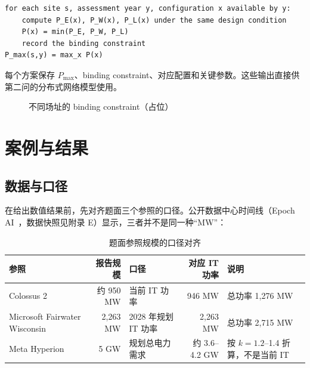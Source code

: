 \documentclass{mcmthesis}
\begin{document}
\begin{lstlisting}[basicstyle=\ttfamily\small, frame=single, columns=fullflexible]
for each site s, assessment year y, configuration x available by y:
    compute P_E(x), P_W(x), P_L(x) under the same design condition
    P(x) = min(P_E, P_W, P_L)
    record the binding constraint
P_max(s,y) = max_x P(x)
\end{lstlisting}

每个方案保存 \(P_{\max}\)、binding constraint、对应配置和关键参数。这些输出直接供第二问的分布式网络模型使用。

\begin{figure}[H]
\centering
{}
\caption{不同场址的 binding constraint（占位）}
\label{fig:binding}
\end{figure}

\section{案例与结果}
\label{sec:results}

\subsection{数据与口径}

在给出数值结果前，先对齐题面三个参照的口径。公开数据中心时间线（Epoch AI~\cite{epoch2026}，数据快照见附录 E）显示，三者并不是同一种“MW”：

\begin{table}[H]
\centering
\caption{题面参照规模的口径对齐}
\label{tab:reference}
\small
\begin{tabularx}{\textwidth}{@{}l r l r X@{}}
\toprule
参照 & 报告规模 & 口径 & 对应 IT 功率 & 说明 \\
\midrule
Colossus 2 & 约 950 MW & 当前 IT 功率 & 946 MW & 总功率 1,276 MW \\
Microsoft Fairwater Wisconsin & 2,263 MW & 2028 年规划 IT 功率 & 2,263 MW & 总功率 2,715 MW \\
Meta Hyperion & 5 GW & 规划总电力需求 & 约 3.6--4.2 GW & 按 \(k=1.2\)--1.4 折算，不是当前 IT \\
\bottomrule
\end{tabularx}
\end{table}
\end{document}
